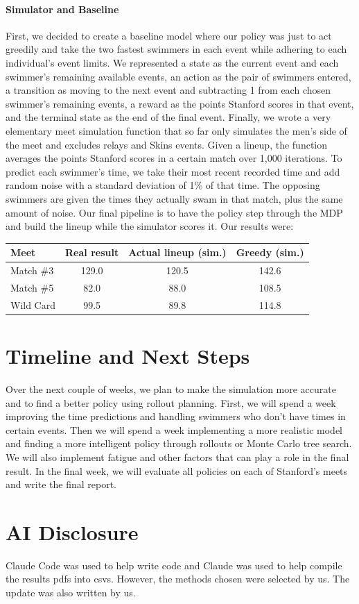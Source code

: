 \documentclass[11pt]{article}
\begin{document}
\paragraph{Simulator and Baseline} First, we decided to create a baseline model where our policy was just to act greedily and take the two fastest swimmers in each event while adhering to each individual's event limits. We represented a state as the current event and each swimmer's remaining available events, an action as the pair of swimmers entered, a transition as moving to the next event and subtracting 1 from each chosen swimmer's remaining events, a reward as the points Stanford scores in that event, and the terminal state as the end of the final event. Finally, we wrote a very elementary meet simulation function that so far only simulates the men's side of the meet and excludes relays and Skins events. Given a lineup, the function averages the points Stanford scores in a certain match over 1,000 iterations. To predict each swimmer's time, we take their most recent recorded time and add random noise with a standard deviation of 1\% of that time. The opposing swimmers are given the times they actually swam in that match, plus the same amount of noise. Our final pipeline is to have the policy step through the MDP and build the lineup while the simulator scores it. Our results were:

\begin{table}[!h]
\centering\small\vspace{-6pt}
\begin{tabular}{lccc}
\toprule
Meet & Real result & Actual lineup (sim.) & Greedy (sim.) \\
\midrule
Match \#3  & 129.0 & 120.5 & 142.6 \\
Match \#5  & 82.0  & 88.0  & 108.5 \\
Wild Card  & 99.5  & 89.8  & 114.8 \\
\bottomrule
\end{tabular}
\end{table}

\section{Timeline and Next Steps}

Over the next couple of weeks, we plan to make the simulation more accurate and to find a better policy using rollout planning. First, we will spend a week improving the time predictions and handling swimmers who don't have times in certain events. Then we will spend a week implementing a more realistic model and finding a more intelligent policy through rollouts or Monte Carlo tree search. We will also implement fatigue and other factors that can play a role in the final result. In the final week, we will evaluate all policies on each of Stanford's meets and write the final report.

\section{AI Disclosure}

Claude Code was used to help write code and Claude was used to help compile the results pdfs into csvs. However, the methods chosen were selected by us. The update was also written by us.
\end{document}
